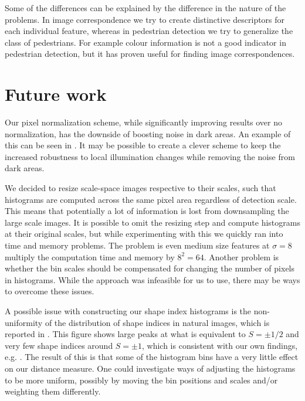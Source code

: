\documentclass[thesis.tex]{subfiles}
\begin{document}
Some of the differences can be explained by the difference in the nature of the problems. In image correspondence we try to create distinctive descriptors for each individual feature, whereas in pedestrian detection we try to generalize the class of pedestrians. For example colour information is not a good indicator in pedestrian detection, but it has proven useful for finding image correspondences.

\section{Future work} %
%
Our pixel normalization scheme, while significantly improving results over no normalization, has the downside of boosting noise in dark areas. An example of this can be seen in . It may be possible to create a clever scheme to keep the increased robustness to local illumination changes while removing the noise from dark areas.

We decided to resize scale-space images respective to their scales, such that histograms are computed across the same pixel area regardless of detection scale. This means that potentially a lot of information is lost from downsampling the large scale images. It is possible to omit the resizing step and compute histograms at their original scales, but while experimenting with this we quickly ran into time and memory problems. The problem is even medium size features at $\sigma = 8$ multiply the computation time and memory by $8^2 = 64$. Another problem is whether the bin scales should be compensated for changing the number of pixels in histograms. While the approach was infeasible for us to use, there may be ways to overcome these issues.

A possible issue with constructing our shape index histograms is the non-uniformity of the distribution of shape indices in natural images, which is reported in \citep[Fig. 3]{lillholm2009statistics}. This figure shows large peaks at what is equivalent to $S = \pm 1/2$ and very few shape indices around $S = \pm 1$, which is consistent with our own findings, e.g. . The result of this is that some of the histogram bins have a very little effect on our distance measure. One could investigate ways of adjusting the histograms to be more uniform, possibly by moving the bin positions and scales and/or weighting them differently.
\end{document}
